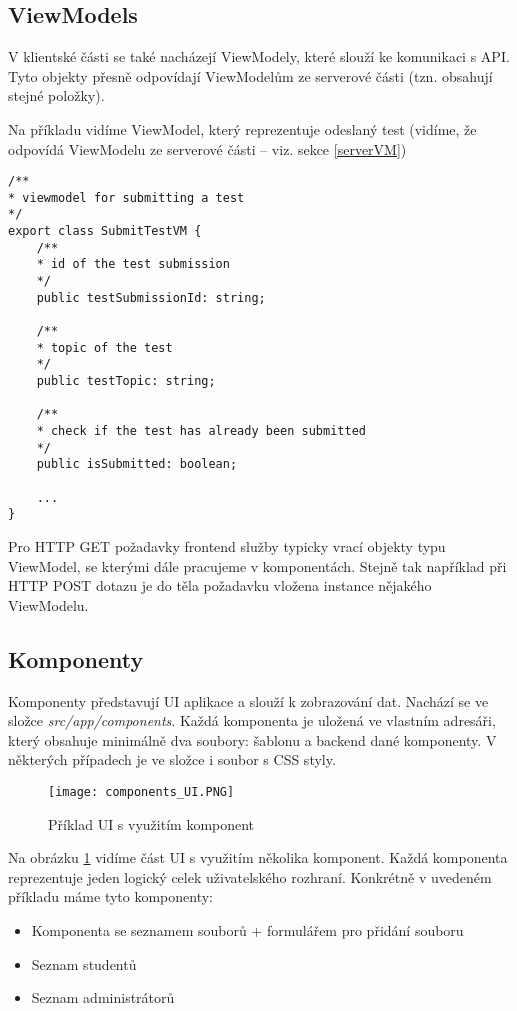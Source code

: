 \subsection{ViewModels}
\label{clientVM}

V klientské části se také nacházejí ViewModely, které slouží ke komunikaci s API. Tyto objekty přesně odpovídají ViewModelům ze serverové části (tzn. obsahují stejné položky).

Na příkladu vidíme ViewModel, který reprezentuje odeslaný test (vidíme, že odpovídá ViewModelu ze serverové části -- viz. sekce \ref{serverVM})
\begin{lstlisting}
/**
* viewmodel for submitting a test
*/
export class SubmitTestVM {
	/**
	* id of the test submission
	*/
	public testSubmissionId: string;
	
	/**
	* topic of the test
	*/
	public testTopic: string;
	
	/**
	* check if the test has already been submitted
	*/
	public isSubmitted: boolean;
	
	...
}
\end{lstlisting}

Pro HTTP GET požadavky frontend služby typicky vrací objekty typu ViewModel, se kterými dále pracujeme v komponentách. Stejně tak například při HTTP POST dotazu je do těla požadavku vložena instance nějakého ViewModelu.

\subsection{Komponenty}

Komponenty představují UI aplikace a slouží k zobrazování dat. Nachází se ve složce \textit{src/app/components}. Každá komponenta je uložená ve vlastním adresáři, který obsahuje minimálně dva soubory: šablonu a backend dané komponenty. V některých případech je ve složce i soubor s CSS styly.

\begin{figure}
	\centering
	\texttt{[image: components\_UI.PNG]}
	\caption{Příklad UI s využitím komponent}
	\label{fig:Components}
\end{figure}

Na obrázku \ref{fig:Components} vidíme část UI s využitím několika komponent. Každá komponenta reprezentuje jeden logický celek uživatelského rozhraní. Konkrétně v uvedeném příkladu máme tyto komponenty:

\begin{itemize}
	\item Komponenta se seznamem souborů + formulářem pro přidání souboru
	\item Seznam studentů
	\item Seznam administrátorů
\end{itemize}

